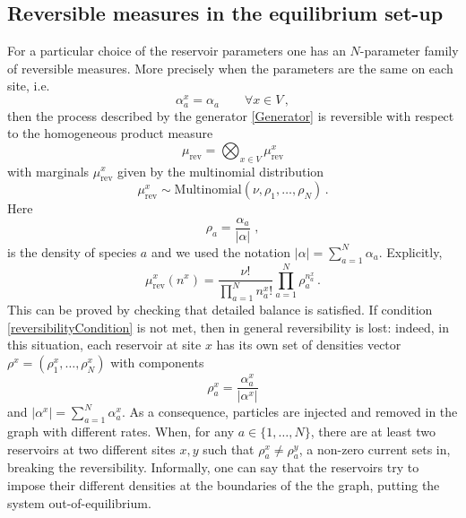 \documentclass[10pt]{article}
\numberwithin{equation}{section}
\numberwithin{equation}{subsection}
\newcommand{\co}{\;,}
\newcommand{\twoj}{\nu}
\begin{document}
\subsection{Reversible measures in the equilibrium set-up}
For a particular choice of the reservoir parameters one has an $N$-parameter family of reversible measures. More precisely
when the parameters are the same on each site, i.e.
\begin{equation}\label{reversibilityCondition}
\alpha_{a}^{x}=\alpha_{a}\qquad \forall x\in V\,,
\end{equation}
then the process described by the generator \eqref{Generator} is reversible with respect to the 
homogeneous product measure 
\begin{equation}
\label{reversibleMeasure}
\mu_{\text{rev}}=\bigotimes_{x\in V}\mu_{\text{rev}}^{x}
\end{equation}
with marginals $\mu_{\text{rev}}^{x}$ given by  the multinomial distribution
\begin{equation}
 \mu^{x}_{\text{rev}}\sim \text{Multinomial}\left(\twoj,\rho_{1},\ldots,\rho_{N}\right)\,.
\end{equation}
Here
 $$
\rho_{a}=\frac{\alpha_{a}}{|\alpha|}\co
$$
is the density of species $a$ and we used the notation $|\alpha|=\sum_{a=1}^{N}\alpha_{a}$. Explicitly, 
\begin{equation}
\mu_{\text{rev}}^{x}(n^{x})=\frac{\nu!}{\prod_{a=1}^{N}n_{a}^{x}!}\prod_{a=1}^{N}\rho_{a}^{n_{a}^{x}}\,.
\end{equation}
This can be proved  by checking that detailed balance is satisfied. 
If condition \eqref{reversibilityCondition} is not met, then in general reversibility is lost: indeed, in this situation, each reservoir at site $x$ has  its own set of densities vector $\rho^{x}=(\rho_{1}^{x},\ldots,\rho_{N}^{x})$ with components
\begin{equation}
	\label{rhox}
	\rho_{a}^x=\frac{\alpha_{a}^x}{|\alpha^x|}
\end{equation}
and  $|\alpha^x|=\sum_{a=1}^{N}\alpha_{a}^x$. {\color{blue} As a consequence, particles are injected and removed in the graph with different rates. When, for any $a\in \{1,\ldots,N\}$, there are at least two reservoirs at two different sites $x,y$ such that $\rho_{a}^{x}\neq  \rho_{a}^{y}$, a  non-zero current sets in, breaking the reversibility. Informally, one can say that the reservoirs try to impose their different densities at the boundaries of the the graph, putting the system out-of-equilibrium.} %
\end{document}
